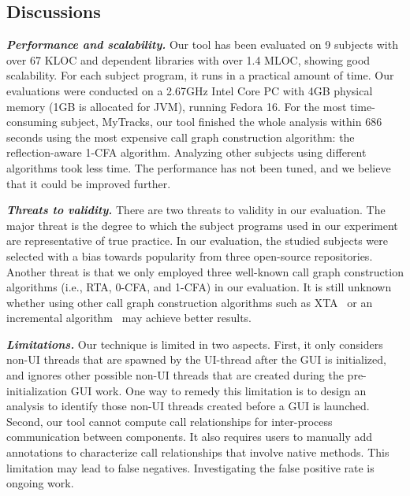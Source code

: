 \subsection{Discussions}

\noindent \textbf{\textit{Performance and scalability.}} Our tool
has been evaluated on 9 subjects with over 67 KLOC and dependent
libraries with over 1.4 MLOC, showing good scalability.
For each subject program, it runs in a practical amount of time. Our evaluations
were conducted on a 2.67GHz Intel Core PC with 4GB
physical memory (1GB is allocated for JVM), running Fedora 16.
For the most time-consuming subject, MyTracks, our tool finished the whole analysis
within 686 seconds using the most expensive call graph construction
algorithm: the reflection-aware 1-CFA algorithm. Analyzing
other subjects using different algorithms took less time.
The performance has not been tuned, and we believe
that it could be improved further.



\vspace{1mm}

\noindent \textbf{\textit{Threats to validity.}}
There are two threats to validity in our evaluation. 
The major threat is the degree to which the subject programs
used in our experiment are representative of true practice.
In our evaluation, the studied subjects were selected with a bias towards popularity from
three open-source repositories. Another threat is that we only employed three
well-known call graph construction algorithms (i.e., RTA, 0-CFA, and 1-CFA) 
in our evaluation. It is still unknown whether using other 
call graph construction algorithms such as XTA~\cite{xta} or
an incremental algorithm~\cite{inccg} may achieve better results.


\vspace{1mm}

\noindent \textbf{\textit{Limitations.}}
Our technique is limited in two aspects. First, it only considers
non-UI threads that are spawned by the UI-thread after the GUI
is initialized, and ignores other possible non-UI threads
that are created during the pre-initialization GUI work. One way
to remedy this limitation is to design an analysis to identify
those non-UI threads created before a GUI is launched.
Second, our tool cannot compute call relationships
for inter-process communication between components. It also
requires users to manually add annotations to characterize
call relationships that involve native methods. This limitation
may lead to false negatives. Investigating the false positive
rate is ongoing work.

